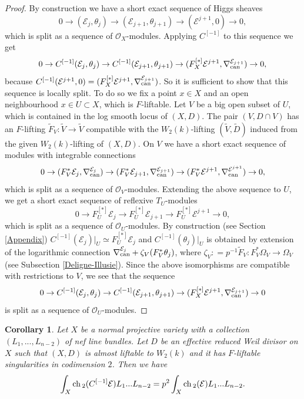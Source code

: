\documentclass[12pt]{article}
\theoremstyle{plain}
\newtheorem{Corollary}[Thm]{\sc Corollary}
\theoremstyle{definition}
\theoremstyle{remark}
\newcommand{\cE}{{\mathcal E}}
\newcommand{\cO}{{\mathcal O}}
\newcommand{\ch}{{\mathop{\rm ch \, }}}
\newcommand{\can}{{\mathop{\rm can}}}
\begin{document}
\begin{proof}
By  construction we have a short exact sequence of Higgs sheaves
$$0\to (\cE _j, \theta _j)\to (\cE _{j+1}, \theta _{j+1})\to (\cE^{j+1},0)\to 0,$$
which is split as a sequence of $\cO_X$-modules.
Applying $ C^{[-1]}$ to this sequence we get
	$$0\to C^{[-1]} (\cE _j, \theta _j)\to C^{[-1]} (\cE _{j+1}, \theta _{j+1})\to (F_X^{[*]}\cE^{j+1},\nabla_{\can}^{\cE_{j+1}})\to 0,$$
	because $ C^{[-1]}  (\cE^{j+1},0)=(F_X^{[*]}\cE^{j+1},\nabla_{\can}^{\cE_{j+1}})$. So it is sufficient to show that this sequence is locally split. 	
To do so we fix a point $x\in X$ and an open neighbourhood $x\in U\subset X$, which is $F$-liftable. 
Let $V$ be a big open subset of $U$, which is contained in the log smooth locus of $(X,D)$.
The pair $(V, D\cap V)$ has an $F$-lifting $\tilde F_V: \tilde V\to \tilde V$ compatible with the $W_2(k)$-lifting $(\tilde V, \tilde D)$ induced from the given $W_2(k)$-lifting of  $(X, D)$.
On $V$ we have a  short exact sequence of modules with integrable connections
$$0\to (F_V^*\cE _j, \nabla_{\can}^{\cE_j})\to (F_V^*\cE _{j+1}, \nabla_{\can}^{\cE_{j+1}})\to (F_V^*\cE^{j+1},\nabla_{\can}^{\cE^{j+1}})\to 0,$$
which is split as a sequence of $\cO_V$-modules.
Extending the above sequence  to $U$, we get a  short exact sequence of reflexive $T_U$-modules
$$0\to F_U^{[*]}\cE _j\to F_U^{[*]}\cE _{j+1}\to  F_U^{[*]}\cE^{j+1}\to 0,$$
which is split as a sequence of $\cO_U$-modules.
By construction (see Section \ref{Appendix}) $C^{[-1]} (\cE _j)|_U\simeq F_U^{[*]}\cE _{j}$ and  $C^{[-1]} (\theta _j)|_U$ is obtained by extension of the logarithmic connection $\nabla _{\can}^{\cE _j}+ \zeta_V (F^*_V\theta _j)$, where 
$\zeta_V: =p^{-1}\tilde F_V: F_V^*\Omega _V\to \Omega _V$ (see Subsection \ref{Deligne-Illusie}).
Since the above isomorphisms are compatible with restrictions to $V$, we see that the sequence 
$$0\to C^{[-1]} (\cE _j, \theta _j)\to C^{[-1]} (\cE _{j+1}, \theta _{j+1})\to (F_X^{[*]}\cE^{j+1},\nabla_{\can}^{\cE_{j+1}})\to 0$$
is split as a sequence of $\cO_U$-modules.
\end{proof}


\begin{Corollary} \label{Chern-classes-Cartier-transform}
Let $X$ be a normal projective variety with a collection $(L_1,...,L_{n-2})$ of nef line bundles.
Let $D$ be an effective reduced Weil divisor on $X$ such that $(X, D)$ is almost liftable 
to $W_2(k)$ and it has  $F$-liftable singularities in codimension $2$.
Then we have 
$$\int _X \ch _2  (C^{[-1]}\cE)L_1...L_{n-2}=p^2\int _X\ch _2   (\cE)L_1...L_{n-2}.$$
\end{Corollary}
\end{document}
